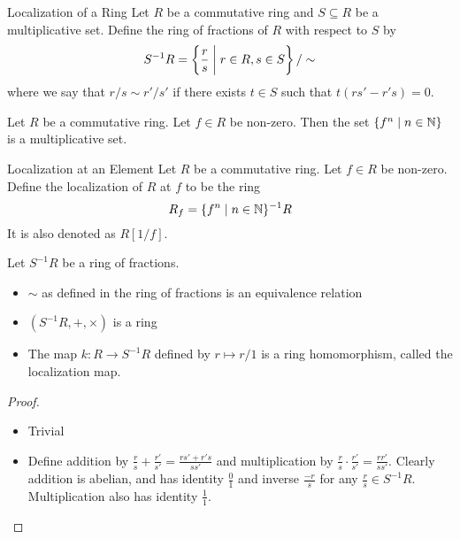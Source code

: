 \documentclass[a4paper]{article}
\begin{document}
\begin{defn}{Localization of a Ring}{} Let $R$ be a commutative ring and $S\subseteq R$ be a multiplicative set. Define the ring of fractions of $R$ with respect to $S$ by $$S^{-1}R=\left\{\frac{r}{s}\;\bigg{|}\;r\in R,s\in S\right\}/\sim$$ where we say that $r/s\sim r'/s'$ if there exists $t\in S$ such that $t(rs'-r's)=0$. 
\end{defn}

\begin{lmm}{}{} Let $R$ be a commutative ring. Let $f\in R$ be non-zero. Then the set $\{f^n\;|\;n\in\mathbb{N}\}$ is a multiplicative set. 
\end{lmm}

\begin{defn}{Localization at an Element}{} Let $R$ be a commutative ring. Let $f\in R$ be non-zero. Define the localization of $R$ at $f$ to be the ring $$R_f=\{f^n\;|\;n\in\mathbb{N}\}^{-1}R$$ It is also denoted as $R[1/f]$. 
\end{defn}

\begin{prp}{}{} Let $S^{-1}R$ be a ring of fractions. 
\begin{itemize}
\item $\sim$ as defined in the ring of fractions is an equivalence relation
\item $(S^{-1}R,+,\times)$ is a ring
\item The map $k:R\to S^{-1}R$ defined by $r\mapsto r/1$ is a ring homomorphism, called the localization map. 
\end{itemize}\tcbline
\begin{proof}~\\
\begin{itemize}
\item Trivial
\item Define addition by $\frac{r}{s}+\frac{r'}{s'}=\frac{rs'+r's}{ss'}$ and multiplication by $\frac{r}{s}\cdot\frac{r'}{s'}=\frac{rr'}{ss'}$. Clearly addition is abelian, and has identity $\frac{0}{1}$ and inverse $\frac{-r}{s}$ for any $\frac{r}{s}\in S^{-1}R$. Multiplication also has identity $\frac{1}{1}$. 
\end{itemize}
\end{proof}
\end{prp}
\end{document}

